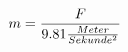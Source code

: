\documentclass[preview]{standalone}
\begin{document}
\begin{align*}
\special{dvisvgm:raw <g id='unique000'>}m = \frac{F}{9.81 \frac{Meter}{Sekunde^{2}}} \special{dvisvgm:raw </g>}
\end{align*}
\end{document}
